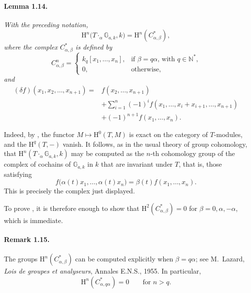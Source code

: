 \paragraph{\textbf{Lemma 1.14.}}
\emph{With the preceding notation,}
\[
  \mathrm H^n\bigl(T\mathbin{\cdot_\alpha}\mathbb G_{a,k},k\bigr)
    =\mathrm H^n(C^\ast_{\alpha,\beta}),
\]
\emph{where the complex \(C^\ast_{\alpha,\beta}\) is defined by}
\[
  C^n_{\alpha,\beta}=
  \begin{cases}
    k_q[x_1,\ldots,x_n],
      &\text{if \(\beta=q\alpha\), with \(q\in\mathbb N^\ast\),}\\
    0,&\text{otherwise,}
  \end{cases}
\]
\emph{and}
\[
\begin{aligned}
(\delta f)(x_1,x_2,\ldots,x_{n+1})
  ={}&f(x_2,\ldots,x_{n+1})\\
   &+\sum_{i=1}^{n}(-1)^i
       f(x_1,\ldots,x_i+x_{i+1},\ldots,x_{n+1})\\
   &+(-1)^{n+1}f(x_1,\ldots,x_n).
\end{aligned}
\]

Indeed, by , the functor
\(M\mapsto\mathrm H^0(T,M)\) is exact on the category of
\(T\)-modules, and the \(\mathrm H^q(T,-)\) vanish. It follows, as
in the usual theory of group cohomology, that
\(\mathrm H^n(T\mathbin{\cdot_\alpha}\mathbb G_{a,k},k)\) may be
computed as the \(n\)-th cohomology group of the complex of
cochains of \(\mathbb G_{a,k}\) in \(k\) that are invariant under
\(T\), that is, those satisfying
\[
  f\bigl(\alpha(t)x_1,\ldots,\alpha(t)x_n\bigr)
    =\beta(t)f(x_1,\ldots,x_n).
\]
This is precisely the complex just displayed.

To prove , it is therefore enough to show that
\(\mathrm H^2(C^\ast_{\alpha,\beta})=0\) for
\(\beta=0,\alpha,-\alpha\), which is immediate.

\paragraph{\textbf{Remark 1.15.}}
The groups \(\mathrm H^n(C^\ast_{\alpha,\beta})\) can be computed
explicitly when \(\beta=q\alpha\); see M.~Lazard,
\emph{Lois de groupes et analyseurs}, Annales E.N.S., 1955. In
particular,
\[
  \mathrm H^n(C^\ast_{\alpha,q\alpha})=0
  \qquad\text{for \(n>q\).}
\]

